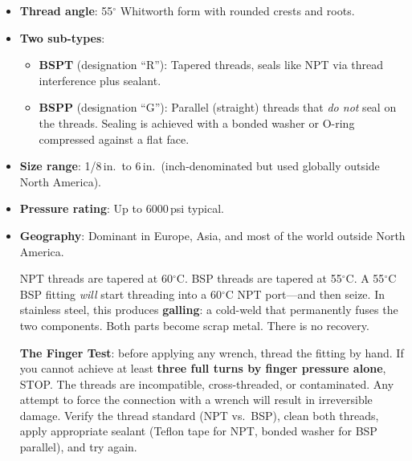 \documentclass[11pt,letterpaper,twoside,openany]{book}
\newcommand{\degC}{\ensuremath{{}^{\circ}\text{C}}}
\providecommand{\ang}[1]{#1\ensuremath{{}^{\circ}}}
\begin{document}
\begin{itemize}[leftmargin=1.5em]
  \item \textbf{Thread angle}: \ang{55} Whitworth form with rounded crests and roots.
  \item \textbf{Two sub-types}:
  \begin{itemize}[nosep]
    \item \textbf{BSPT} (designation ``R''): Tapered threads, seals like NPT via thread interference plus sealant.
    \item \textbf{BSPP} (designation ``G''): Parallel (straight) threads that \emph{do not} seal on the threads. Sealing is achieved with a bonded washer or O-ring compressed against a flat face.
  \end{itemize}
  \item \textbf{Size range}: 1/8\,in.\ to 6\,in.\ (inch-denominated but used globally outside North America).
  \item \textbf{Pressure rating}: Up to 6000\,psi typical.
  \item \textbf{Geography}: Dominant in Europe, Asia, and most of the world outside North America.
\begin{warningbox}
NPT threads are tapered at 60\degC{}. BSP threads are tapered at 55\degC{}. A 55\degC{} BSP fitting \emph{will} start threading into a 60\degC{} NPT port---and then seize. In stainless steel, this produces \textbf{galling}: a cold-weld that permanently fuses the two components. Both parts become scrap metal. There is no recovery.

\textbf{The Finger Test}: before applying any wrench, thread the fitting by hand. If you cannot achieve at least \textbf{three full turns by finger pressure alone}, STOP. The threads are incompatible, cross-threaded, or contaminated. Any attempt to force the connection with a wrench will result in irreversible damage. Verify the thread standard (NPT vs.\ BSP), clean both threads, apply appropriate sealant (Teflon tape for NPT, bonded washer for BSP parallel), and try again.
\end{warningbox}
\end{itemize}
\end{document}

